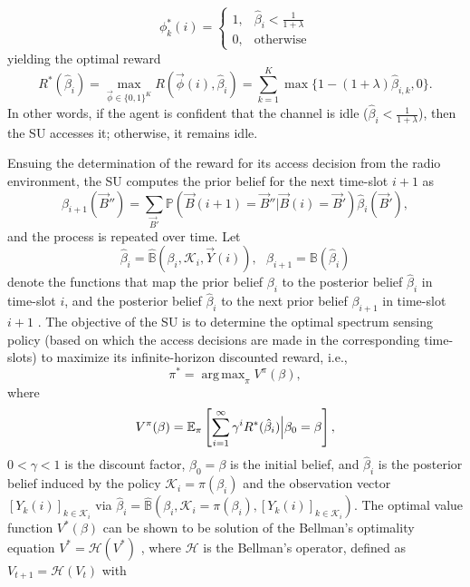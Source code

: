 \documentclass[10pt, twocolumn]{IEEEtran}
\DeclareMathOperator*{\argmax}{arg\,max}
\begin{document}
\begin{equation}
    \phi_{k}^{*}(i) = \left\{
        \begin{array}{cc}
             1, &  \hat{\beta}_{i}{<}\frac{1}{1{+}\lambda}\\
             0, &  \text{otherwise}
        \end{array}\right.
\end{equation}
yielding the optimal reward
$$
R^*(\hat{\beta}_{i})=\max_{\vec{\phi}\in\{0,1\}^K} R(\vec{\phi}(i),\hat{\beta}_{i})
=
\sum_{k=1}^{K}\max\{1-(1+\lambda)\hat{\beta}_{i,k},0\}.
$$
In other words, if the agent is confident that the channel is idle ($\hat{\beta}_{i}{<}\frac{1}{1{+}\lambda}$), then the SU accesses it; otherwise, it remains idle.

Ensuing the determination of the reward for its access decision from the radio environment, the SU computes the prior belief for the next time-slot $i+1$ as
\begin{equation}\label{13}
    \beta_{i+1}(\vec{B}'')=\sum_{\vec{B}'}\mathbb{P}(\vec{B}(i+1)=\vec{B}''|\vec{B}(i)=\vec{B}')\hat{\beta}_i(\vec{B}'),
\end{equation}
and the process is repeated over time.
Let
\begin{equation}\label{14}
    \hat{\beta}_{i}=\hat{\mathbb{B}}(\beta_{i},\mathcal{K}_{i},\vec{Y}(i)),\ \ \ \beta_{i+1}=\mathbb{B}(\hat{\beta}_{i})
\end{equation}
denote the functions that map the prior belief $\beta_{i}$ to the posterior belief $\hat{\beta}_{i}$ in time-slot $i$, and the posterior belief $\hat{\beta}_{i}$ to the next prior belief $\beta_{i+1}$ in time-slot $i+1$ . The objective of the SU is to determine the optimal spectrum sensing policy (based on which the access decisions are made in the corresponding time-slots) to maximize its infinite-horizon discounted reward, i.e.,
\begin{equation}\label{16}
    \pi^{*}=\argmax_{\pi}V^{\pi}(\beta),
\end{equation}
where
\begin{equation}\label{17}
    V^{\pi}(\beta)=\mathbb{E}_{\pi}\left[\sum_{i=1}^{\infty}\gamma^{i}
    R^*(\hat{\beta}_{i})\Big{|}\beta_{0}=\beta\right],
\end{equation}
 $0{<}\gamma{<}1$ is the discount factor, $\beta_{0}{=}\beta$ is the initial belief, and $\hat{\beta}_{i}$ is the posterior belief induced by the policy $\mathcal{K}_{i}{=}\pi(\beta_{i})$ and the observation vector $[Y_{k}(i)]_{k{\in}\mathcal{K}_{i}}$ via $\hat{\beta}_{i} = \hat{\mathbb{B}}(\beta_{i}, \mathcal{K}_{i} = \pi(\beta_{i}), [Y_{k}(i)]_{k \in \mathcal{K}_{i}})$. The optimal value function $V^*(\beta)$ can be shown to be solution of the Bellman's optimality equation $V^{*}{=}\mathcal{H}(V^{*})$ \cite{PUOccupancy:18}, where $\mathcal H$ is the Bellman's operator, defined as $V_{t+1}{=}\mathcal{H}(V_t)$ with
\end{document}
